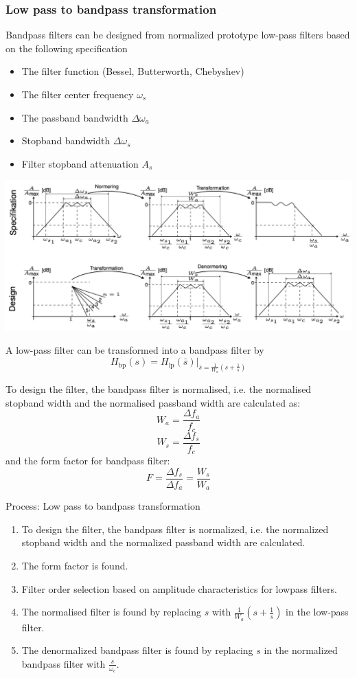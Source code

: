 \subsubsection{Low pass to bandpass transformation}
Bandpass filters can be designed from normalized prototype low-pass filters based on the following specification
\begin{itemize}
  \item The filter function (Bessel, Butterworth, Chebyshev) 
  \item The filter center frequency $\omega_{s}$
  \item The passband bandwidth $\Delta \omega _a$
  \item Stopband bandwidth $\Delta \omega _s$
  \item Filter stopband attenuation $A_{s}$
\end{itemize}

\begin{center}
  \includegraphics[width=\textwidth]{Images/LP-to-BP.png} 
\end{center}
A low-pass filter can be transformed into a bandpass filter by
$$H_{\text{bp}}(s)=H_{\text{lp}}(\bar{s})|_{\bar{s}=\frac{1}{W_{a}}\left( s+\frac{1}{s} \right)}$$

To design the filter, the bandpass filter is normalised, i.e. the normalised stopband width and the normalised passband width are calculated as:
$$W_{a}=\frac{\Delta f_{a}}{f_{c}}$$
$$W_{s}=\frac{\Delta f_{s}}{f_{c}}$$
and the form factor for bandpass filter:
$$F=\frac{\Delta f_{s}}{\Delta f_{a}}=\frac{W_{s}}{W_{a}}$$


Process: Low pass to bandpass transformation
\begin{enumerate}
  \item To design the filter, the bandpass filter is normalized, i.e. the normalized stopband width and the normalized passband width are calculated.
  \item The form factor is found.
  \item Filter order selection based on amplitude characteristics for lowpass filters.
  \item The normalised filter is found by replacing $s$ with $\frac{1}{W_{a}} \left( s + \frac{1}{s} \right)$ in the low-pass filter.
  \item The denormalized bandpass filter is found by replacing $s$ in the normalized bandpass filter with $\frac{s}{\omega_{c}}$.
\end{enumerate}


